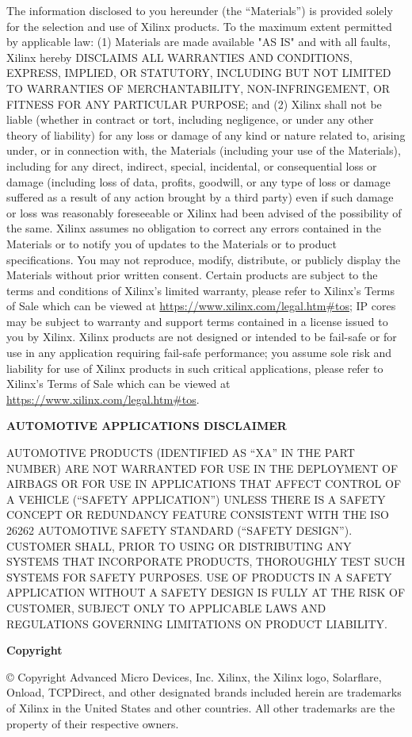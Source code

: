 
The information disclosed to you hereunder (the “Materials”) is provided 
solely for the selection and use of Xilinx products. To the maximum extent 
permitted by applicable law: (1) Materials are made available "AS IS" and 
with all faults, Xilinx hereby DISCLAIMS ALL WARRANTIES AND CONDITIONS, 
EXPRESS, IMPLIED, OR STATUTORY, INCLUDING BUT NOT LIMITED TO WARRANTIES OF 
MERCHANTABILITY, NON-INFRINGEMENT, OR FITNESS FOR ANY PARTICULAR PURPOSE; and 
(2) Xilinx shall not be liable (whether in contract or tort, including 
negligence, or under any other theory of liability) for any loss or damage of 
any kind or nature related to, arising under, or in connection with, the 
Materials (including your use of the Materials), including for any direct, 
indirect, special, incidental, or consequential loss or damage (including 
loss of data, profits, goodwill, or any type of loss or damage suffered as a 
result of any action brought by a third party) even if such damage or loss 
was reasonably foreseeable or Xilinx had been advised of the possibility of 
the same. Xilinx assumes no obligation to correct any errors contained in the 
Materials or to notify you of updates to the Materials or to product 
specifications. You may not reproduce, modify, distribute, or publicly 
display the Materials without prior written consent. Certain products are 
subject to the terms and conditions of Xilinx’s limited warranty, please 
refer to Xilinx’s Terms of Sale which can be viewed at 
\href{https://www.xilinx.com/legal.htm\#tos}{https://www.xilinx.com/legal.htm\#tos}; 
IP cores may be subject to warranty and support terms contained in a license 
issued to you by Xilinx. Xilinx products are not designed or intended to be 
fail-safe or for use in any application requiring fail-safe performance; you 
assume sole risk and liability for use of Xilinx products in such critical 
applications, please refer to Xilinx’s Terms of Sale which can be viewed at 
\href{https://www.xilinx.com/legal.htm\#tos}{https://www.xilinx.com/legal.htm\#tos}.

{\bfseries AUTOMOTIVE APPLICATIONS DISCLAIMER}

AUTOMOTIVE PRODUCTS (IDENTIFIED AS “XA” IN THE PART NUMBER) ARE NOT WARRANTED 
FOR USE IN THE DEPLOYMENT OF AIRBAGS OR FOR USE IN APPLICATIONS THAT AFFECT 
CONTROL OF A VEHICLE (“SAFETY APPLICATION”) UNLESS THERE IS A SAFETY CONCEPT 
OR REDUNDANCY FEATURE CONSISTENT WITH THE ISO 26262 AUTOMOTIVE SAFETY 
STANDARD (“SAFETY DESIGN”). CUSTOMER SHALL, PRIOR TO USING OR DISTRIBUTING 
ANY SYSTEMS THAT INCORPORATE PRODUCTS, THOROUGHLY TEST SUCH SYSTEMS FOR 
SAFETY PURPOSES. USE OF PRODUCTS IN A SAFETY APPLICATION WITHOUT A SAFETY 
DESIGN IS FULLY AT THE RISK OF CUSTOMER, SUBJECT ONLY TO APPLICABLE LAWS AND 
REGULATIONS GOVERNING LIMITATIONS ON PRODUCT LIABILITY.

{\bfseries Copyright}

© Copyright \the\year{} Advanced Micro Devices, Inc. Xilinx, the Xilinx logo, 
Solarflare, Onload, TCPDirect, and other designated brands included herein 
are trademarks of Xilinx in the United States and other countries. All other 
trademarks are the property of their respective owners.

